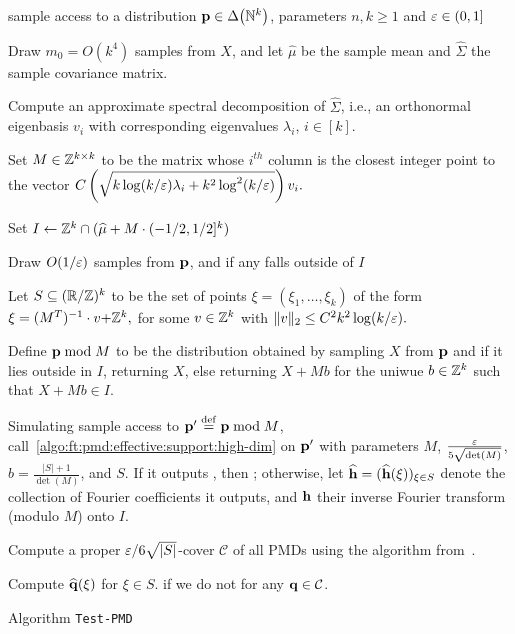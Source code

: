 \begin{algorithm}[ht]
  \begin{algorithmic}[1]
    \Require sample access to a distribution $\mathbf{p}\in\Delta\!\left(\mathbb{N}^k\right)$, parameters $n,k\geq 1$ and $\varepsilon\in(0,1]$
    
    \State{}
    
    \State\label{algo:step:estimates:mu:sigma:pmd} Draw {$m_0 = O(k^4)$} samples from $X$, and 
let $\widehat{\mu}$ be the sample mean and $\widehat{\Sigma}$ the sample covariance matrix.
	
	\State Compute an approximate spectral decomposition of $\widehat{\Sigma}$, i.e., 
an orthonormal eigenbasis $v_i$ with corresponding eigenvalues $\lambda_i$, $i \in [k].$


	\State Set $M \in \mathbb{Z}^{k \times k}$  to be the matrix whose $i^{th}$ column 
is the closest integer point to the vector $C \left(\sqrt{k \log(k/\varepsilon)\lambda_i+k^2\log^2(k/\varepsilon)}\right)v_i.$
	
	\State Set $I \gets \mathbb{Z}^k\cap (\widehat{\mu} + M \cdot (-1/2,1/2]^k)$

	\State\label{algo:step:effectivesupport:pmd} Draw $O(1/\varepsilon)$ samples from $\mathbf{p}$, and \Return \reject if any falls outside of $I$

	\State\label{algo:step:dft:computation:pmd} Let $S \subseteq (\mathbb{R}/\mathbb{Z})^k$ to be the set of points $\xi = (\xi_1, \ldots, \xi_k)$ 
of the form $\xi = (M^T)^{-1} \cdot v {+\mathbb{Z}^k},$ for some $v\in \mathbb{Z}^k$ with $\|v\|_2 \leq C^2 k^2 \log(k/\varepsilon).$

	\State Define $\mathbf{p}\bmod M$ to be the distribution obtained by sampling $X$ from $\mathbf{p}$ and if it lies outside in $I$, returning $X$, else returning $X + M b$ for the uniwue $b \in \mathbb{Z}^k$ such that $X + M b \in I$.

	\State\label{algo:step:fourier:support:pmd} Simulating sample access to $\mathbf{p}'\stackrel{\rm def}{=} \mathbf{p}\bmod M$, call~\cref{algo:ft:pmd:effective:support:high-dim} on $\mathbf{p}'$ with parameters $M$, $\frac{\varepsilon}{5\sqrt{\det(M)}}$, $b=\frac{|S|+1}{\det(M)}$, and $S$. If it outputs \reject, then \Return \reject; otherwise, let $\widehat{\mathbf{h}}=(\widehat{\mathbf{h}}(\xi))_{\xi\in S}$ denote the collection of Fourier coefficients it outputs, and $\mathbf{h}$ their inverse Fourier transform (modulo $M$) onto $I$.  

    \State \label{algo:step:cover:pmd} Compute a proper $\varepsilon/6\sqrt{|S|}$-cover $\mathcal{C}$ of all PMDs using the algorithm from~\cite{DKS:15c}.
	
			\State Compute $\widehat{\mathbf{q}}(\xi)$ for $\xi \in S$.
				\Return \accept
			\EndIf
		\EndIf
	\EndFor
	\State \Return \reject if we do not \accept for any $\mathbf{q} \in \mathcal{C}$.
  \end{algorithmic}
  \caption{Algorithm \texttt{Test-PMD}}\label{algo:pmd:tester}
\end{algorithm}

